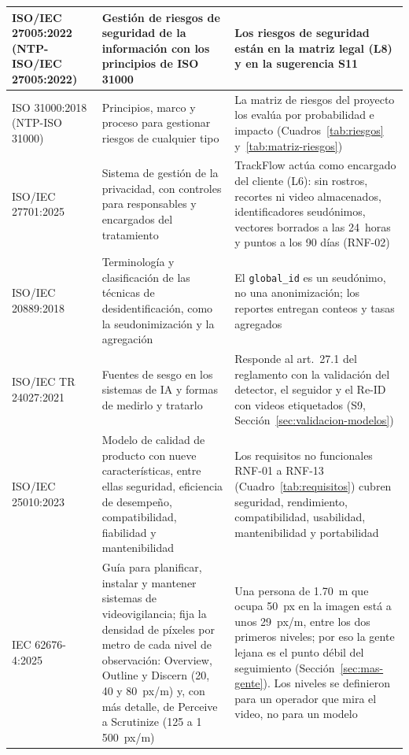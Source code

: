 \documentclass[12pt,a4paper]{article}
\begin{document}
{\begin{longtable}{|L{0.22\textwidth}|L{0.33\textwidth}|L{0.37\textwidth}|}
\hline
ISO/IEC 27005:2022 (NTP-ISO/IEC 27005:2022)~\cite{iso27005} & Gestión de riesgos de seguridad de la información con los principios de ISO 31000 & Los riesgos de seguridad están en la matriz legal (L8) y en la sugerencia S11 \\
\hline
ISO 31000:2018 (NTP-ISO 31000)~\cite{iso31000} & Principios, marco y proceso para gestionar riesgos de cualquier tipo & La matriz de riesgos del proyecto los evalúa por probabilidad e impacto (Cuadros~\ref{tab:riesgos} y~\ref{tab:matriz-riesgos}) \\
\hline
ISO/IEC 27701:2025~\cite{iso27701} & Sistema de gestión de la privacidad, con controles para responsables y encargados del tratamiento & TrackFlow actúa como encargado del cliente (L6): sin rostros, recortes ni video almacenados, identificadores seudónimos, vectores borrados a las 24~horas y puntos a los 90 días (RNF-02) \\
\hline
ISO/IEC 20889:2018~\cite{iso20889} & Terminología y clasificación de las técnicas de desidentificación, como la seudonimización y la agregación & El \texttt{global\_id} es un seudónimo, no una anonimización; los reportes entregan conteos y tasas agregados \\
\hline
ISO/IEC TR 24027:2021~\cite{iso24027} & Fuentes de sesgo en los sistemas de IA y formas de medirlo y tratarlo & Responde al art.~27.1 del reglamento con la validación del detector, el seguidor y el Re-ID con videos etiquetados (S9, Sección~\ref{sec:validacion-modelos}) \\
\hline
ISO/IEC 25010:2023~\cite{iso25010} & Modelo de calidad de producto con nueve características, entre ellas seguridad, eficiencia de desempeño, compatibilidad, fiabilidad y mantenibilidad & Los requisitos no funcionales RNF-01 a RNF-13 (Cuadro~\ref{tab:requisitos}) cubren seguridad, rendimiento, compatibilidad, usabilidad, mantenibilidad y portabilidad \\
\hline
IEC 62676-4:2025~\cite{iec62676} & Guía para planificar, instalar y mantener sistemas de videovigilancia; fija la densidad de píxeles por metro de cada nivel de observación: Overview, Outline y Discern (20, 40 y 80~px/m) y, con más detalle, de Perceive a Scrutinize (125 a 1\,500~px/m)~\cite{axis-pixeles} & Una persona de 1.70~m que ocupa 50~px en la imagen está a unos 29~px/m, entre los dos primeros niveles; por eso la gente lejana es el punto débil del seguimiento (Sección~\ref{sec:mas-gente}). Los niveles se definieron para un operador que mira el video, no para un modelo \\
\hline
\end{longtable}
}
\end{document}
